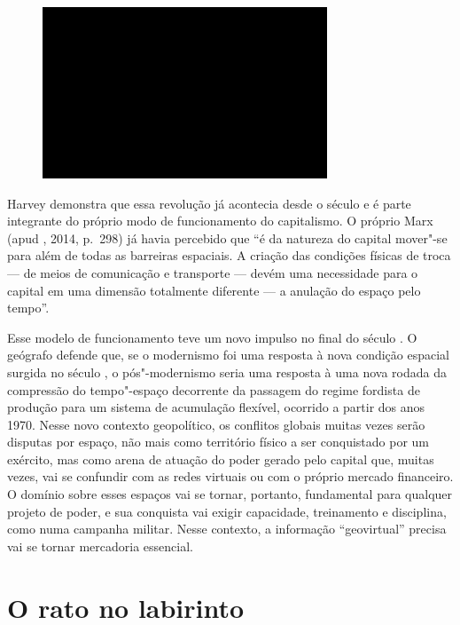 \begin{figure}[!ht]

\centering
 \includegraphics[width=85mm]{./imgs/im1.jpg}
\caption{\tiny{}}

\end{figure}

Harvey demonstra que essa revolução já acontecia desde o século  e é
parte integrante do próprio modo de funcionamento do capitalismo. O
próprio Marx (apud , 2014, p.~298) já havia percebido que ``é da natureza do capital mover"-se
para além de todas as barreiras espaciais. A criação das condições
físicas de troca --- de meios de comunicação e transporte --- devém uma
necessidade para o capital em uma dimensão totalmente diferente --- a
anulação do espaço pelo tempo''.

Esse modelo de funcionamento teve um novo impulso no final do século .
O geógrafo defende que, se o modernismo foi uma resposta à nova condição
espacial surgida no século , o pós"-modernismo seria uma resposta à
uma nova rodada da compressão do tempo"-espaço decorrente da passagem do
regime fordista de produção para um sistema de acumulação flexível,
ocorrido a partir dos anos 1970. Nesse novo contexto geopolítico, os
conflitos globais muitas vezes serão disputas por espaço, não mais como
território físico a ser conquistado por um exército, mas como arena de
atuação do poder gerado pelo capital que, muitas vezes, vai se confundir
com as redes virtuais ou com o próprio mercado financeiro. O domínio
sobre esses espaços vai se tornar, portanto, fundamental para qualquer
projeto de poder, e sua conquista vai exigir capacidade, treinamento e
disciplina, como numa campanha militar. Nesse contexto, a informação
``geovirtual'' precisa vai se tornar mercadoria essencial.

\chapter{O rato no labirinto}

